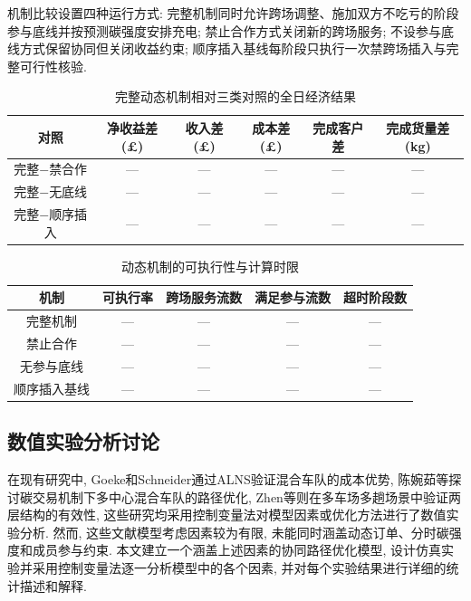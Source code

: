 \documentclass{setp-new}
\newcommand{\setptabsetup}{\fontsize{9pt}{10.5pt}\selectfont\renewcommand{\arraystretch}{0.90}\setlength{\tabcolsep}{2.2pt}\setlength{\aboverulesep}{0.4pt}\setlength{\belowrulesep}{0.4pt}\hbadness=10000}
\begin{document}
机制比较设置四种运行方式:
完整机制同时允许跨场调整、施加双方不吃亏的阶段参与底线并按预测碳强度安排充电;
禁止合作方式关闭新的跨场服务;
不设参与底线方式保留协同但关闭收益约束;
顺序插入基线每阶段只执行一次禁跨场插入与完整可行性核验.

\begin{table}[H]
\centering
\caption{完整动态机制相对三类对照的全日经济结果}
\label{tab:dynamic-economics}
\setptabsetup
\begin{tabular}{@{}cccccc@{}}
\toprule
对照 & 净收益差(£) & 收入差(£) & 成本差(£) & 完成客户差 & 完成货量差(kg)\\
\midrule
完整$-$禁合作    & --- & --- & --- & --- & ---\\
完整$-$无底线    & --- & --- & --- & --- & ---\\
完整$-$顺序插入  & --- & --- & --- & --- & ---\\
\bottomrule
\end{tabular}
\end{table}

\begin{table}[H]
\centering
\caption{动态机制的可执行性与计算时限}
\label{tab:dynamic-diagnostics}
\setptabsetup
\begin{tabular}{@{}ccccc@{}}
\toprule
机制 & 可执行率 & 跨场服务流数 & 满足参与流数 & 超时阶段数\\
\midrule
完整机制      & --- & --- & --- & ---\\
禁止合作      & --- & --- & --- & ---\\
无参与底线    & --- & --- & --- & ---\\
顺序插入基线  & --- & --- & --- & ---\\
\bottomrule
\end{tabular}
\end{table}

\subsection{数值实验分析讨论}

在现有研究中,
Goeke和Schneider\cite{ref:27}通过ALNS验证混合车队的成本优势,
陈婉茹等\cite{ref:23}探讨碳交易机制下多中心混合车队的路径优化,
Zhen等\cite{ref:44}则在多车场多趟场景中验证两层结构的有效性,
这些研究均采用控制变量法对模型因素或优化方法进行了数值实验分析.
然而, 这些文献模型考虑因素较为有限,
未能同时涵盖动态订单、分时碳强度和成员参与约束.
本文建立一个涵盖上述因素的协同路径优化模型,
设计仿真实验并采用控制变量法逐一分析模型中的各个因素,
并对每个实验结果进行详细的统计描述和解释.
\end{document}
